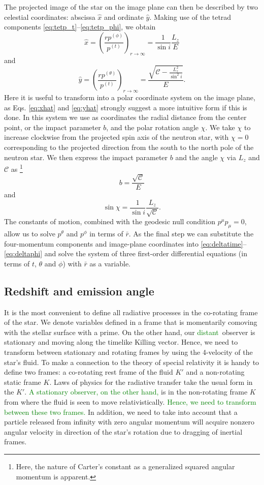 \documentclass{aa}
\newcommand{\be}{\begin{equation}}
\newcommand{\ee}{\end{equation}}
\newcommand{\refe}[1]{\textcolor{green}{{#1}}}
\newcommand{\Ca}{\ensuremath{\mathcal{C}}}
\newcommand{\rb}{\ensuremath{\bar{r}}}
\begin{document}
The projected image of the star on the image plane can then be described by two celestial coordinates:
abscissa $\hat{x}$ and ordinate $\hat{y}$.
Making use of the tetrad components \eqref{eq:tetp_t}--\eqref{eq:tetp_phi}, we obtain \citep[][p.347]{cha}
\be\label{eq:xhat}
\hat{x} = \left( \frac{rp^{(\phi)}}{p^{(t)}} \right)_{r \rightarrow \infty} = \frac{1}{\sin i} \frac{L_z}{E}
\ee
and
\be\label{eq:yhat}
\hat{y} = \left( \frac{rp^{(\theta)}}{p^{(t)}} \right)_{r \rightarrow \infty} = \frac{\sqrt{\Ca - \frac{L_z^2}{\sin^2 i}}}{E}.
\ee
Here it is useful to transform into a polar coordinate system on the image plane, as Eqs. \eqref{eq:xhat} and \eqref{eq:yhat} strongly suggest a more intuitive form if this is done. 
In this system we use as coordinates the radial distance from the center point, or the impact parameter $b$, and the polar rotation angle $\chi$.  
We take $\chi$ to increase clockwise from the projected spin axis of the neutron star, with $\chi=0$ corresponding to the projected direction from the south to the north pole of the neutron star.  
We then express the impact parameter $b$ and the angle $\chi$ via $L_z$ and $\Ca$ as%
\footnote{
    Here, the nature of Carter's constant as a generalized squared
    angular momentum is apparent.
}
\be
b = \frac{\sqrt{\Ca}}{E}
\ee
and
\be
\sin \chi = \frac{1}{\sin i} \frac{L_z}{\sqrt{\Ca}}.
\ee
The constants of motion, combined with the geodesic null condition $p^\mu p_\mu = 0$, allow us to solve $p^\theta$ and $p^\phi$ in terms of $\rb$.
As the final step we can substitute the four-momentum components and image-plane coordinates into \eqref{eq:deltatime}--\eqref{eq:deltaphi} and solve the system of three first-order differential equations (in terms of $t$, $\theta$ and $\phi$) with $\rb$ as a variable.


\subsection{Redshift and emission angle}\label{sect:redshift_angle}
It is the most convenient to define all radiative processes in the co-rotating frame of the star.
We denote variables defined in a frame that is momentarily comoving with the stellar surface with a prime.  
On the other hand, our \refe{distant} observer is stationary and moving along the timelike Killing vector.  
Hence, we need to transform between stationary and rotating frames by using the 4-velocity of the star's fluid.  
To make a connection to the theory of special relativity it is handy to define two frames: 
a co-rotating rest frame of the fluid $K'$ and a non-rotating static frame $K$.
Laws of physics for the radiative transfer take the usual form in the $K'$.
\refe{A stationary observer, on the other hand,} is in the non-rotating frame $K$ from where the fluid is seen to move relativistically.
\refe{Hence, we need to transform between these two frames.}
In addition, we need to take into account that a particle released from infinity with zero angular momentum will acquire nonzero angular velocity in direction of the star's rotation due to dragging of inertial frames.
\end{document}
